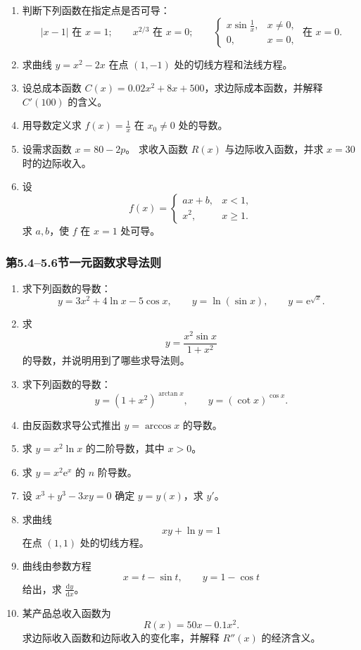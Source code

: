 \documentclass[fontset=fandol]{ctexart}
\newcommand{\dd}{\mathrm{d}}
\newcommand{\ee}{\mathrm{e}}
\begin{document}
\begin{enumerate}[label=\textbf{练习\arabic*.},leftmargin=2.2em]
\item 判断下列函数在指定点是否可导：
\[
|x-1|\text{ 在 }x=1;\qquad
x^{2/3}\text{ 在 }x=0;\qquad
\begin{cases}x\sin\frac1x,&x\neq0,\\0,&x=0,\end{cases}\text{ 在 }x=0.
\]
\item 求曲线 $y=x^2-2x$ 在点 $(1,-1)$ 处的切线方程和法线方程。
\item 设总成本函数 $C(x)=0.02x^2+8x+500$，求边际成本函数，并解释 $C'(100)$ 的含义。
\item 用导数定义求 $f(x)=\frac1x$ 在 $x_0\neq0$ 处的导数。
\item 设需求函数 $x=80-2p$。 求收入函数 $R(x)$ 与边际收入函数，并求 $x=30$ 时的边际收入。
\item 设
\[
f(x)=
\begin{cases}
ax+b,&x<1,\\
x^2,&x\geq1.
\end{cases}
\]
求 $a,b$，使 $f$ 在 $x=1$ 处可导。
\end{enumerate}

\subsubsection*{第5.4--5.6节\quad 一元函数求导法则}

\begin{enumerate}[label=\textbf{练习\arabic*.},leftmargin=2.2em]
\item 求下列函数的导数：
\[
y=3x^2+4\ln x-5\cos x,\qquad
y=\ln(\sin x),\qquad
y=\ee^{\sqrt{x}}.
\]
\item 求
\[
y=\frac{x^2\sin x}{1+x^2}
\]
的导数，并说明用到了哪些求导法则。
\item 求下列函数的导数：
\[
y=(1+x^2)^{\arctan x},\qquad
y=(\cot x)^{\cos x}.
\]
\item 由反函数求导公式推出 $y=\arccos x$ 的导数。
\item 求 $y=x^2\ln x$ 的二阶导数，其中 $x>0$。
\item 求 $y=x^2\ee^x$ 的 $n$ 阶导数。
\item 设 $x^3+y^3-3xy=0$ 确定 $y=y(x)$，求 $y'$。
\item 求曲线
\[
xy+\ln y=1
\]
在点 $(1,1)$ 处的切线方程。
\item 曲线由参数方程
\[
x=t-\sin t,\qquad y=1-\cos t
\]
给出，求 $\frac{\dd y}{\dd x}$。
\item 某产品总收入函数为
\[
R(x)=50x-0.1x^2.
\]
求边际收入函数和边际收入的变化率，并解释 $R''(x)$ 的经济含义。
\end{enumerate}
\end{document}
